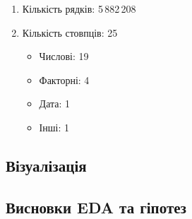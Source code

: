\documentclass{article}
\begin{document}
\begin{enumerate}
    \item Кількість рядків: 5\,882\,208
    \item Кількість стовпців: 25

    \begin{itemize}
      \item Числові: 19
      \item Факторні: 4
      \item Дата: 1
      \item Інші: 1
    \end{itemize}
  \end{enumerate}

\subsection{Візуалізація}
\subsection{Висновки EDA та гіпотез}
\end{document}
